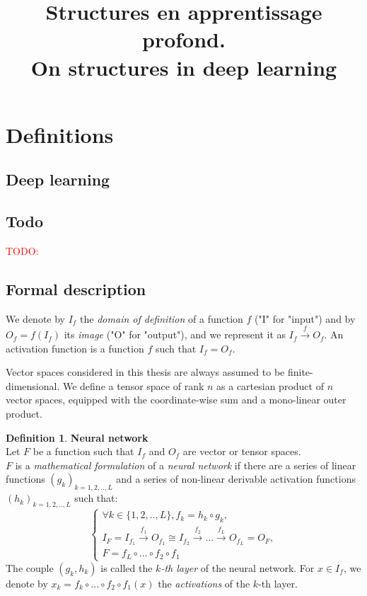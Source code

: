 \documentclass{article}
\title{Structures en apprentissage profond.\\ On structures in deep learning}
\theoremstyle{definition}
\newtheorem{definition}{Definition}[section]
\newcommand{\ovec}{}
\newcommand{\todo}[1]{\textcolor{red}{TODO: #1}}
\begin{document}
\section{Definitions}

\subsection{Deep learning}

\subsection{Todo}
\todo{}

\subsection{Formal description}

We denote by $I_f$ the \textit{domain of definition} of a function $f$ ("I" for "input") and by $O_f = f(I_f)$ its \textit{image} ("O" for "output"), and we represent it as $I_f \xrightarrow{f} O_f$.
An activation function is a function $f$ such that $I_f = O_f$.

Vector spaces considered in this thesis are always assumed to be finite-dimensional.
We define a tensor space of rank $n$ as a cartesian product of $n$ vector spaces, equipped with the coordinate-wise sum and a mono-linear outer product.

\begin{definition}\textbf{Neural network}\\
\label{nndef}
{Let $F$ be a function such that $I_f$ and $O_f$ are vector or tensor spaces.\\
$F$ is a \emph{mathematical formulation} of a \emph{neural network} if there are a series of linear functions $(g_k)_{k=1,2,..,L}$ and a series of non-linear derivable activation functions $(h_k)_{k=1,2,..,L}$ such that:
$$
\left\{
  \begin{array}{l}
    \forall k \in \{1,2,..,L\}, f_k = h_k \circ g_k, \\
    I_F = I_{f_1} \xrightarrow{f_1} O_{f_1} \cong I_{f_2} \xrightarrow{f_2} \dots \xrightarrow{f_L} O_{f_L} = O_F, \\
    F = f_{L} \circ ... \circ f_{2} \circ f_1
  \end{array}
\right.
$$
The couple $(g_k, h_k)$ is called the \emph{$k$-th layer} of the neural network.
For $\ovec{x} \in I_f$, we denote by $\ovec{x_k} = f_k \circ ... \circ f_{2} \circ f_1 (\ovec{x})$ the \emph{activations} of the $k$-th layer.
}
\end{definition}
\end{document}
